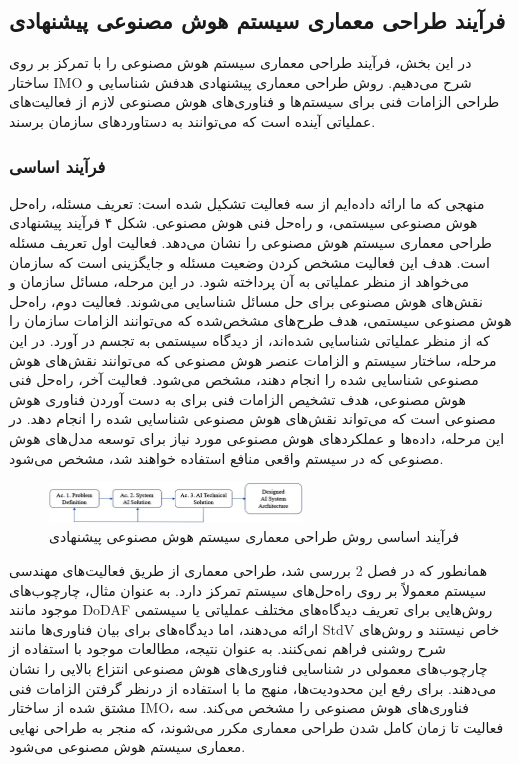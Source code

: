 \documentclass[a4paper,10pt]{article}
\begin{document}
        \subsection{فرآیند طراحی معماری سیستم هوش مصنوعی پیشنهادی}

            در این بخش، فرآیند طراحی معماری سیستم هوش مصنوعی را با تمرکز بر روی ساختار IMO شرح می‌دهیم. روش طراحی معماری پیشنهادی هدفش شناسایی و طراحی الزامات فنی برای سیستم‌ها و فناوری‌های هوش مصنوعی لازم از فعالیت‌های عملیاتی آینده است که می‌توانند به دستاوردهای سازمان برسند.

            \subsubsection{فرآیند اساسی}

                منهجی که ما ارائه داده‌ایم از سه فعالیت تشکیل شده است: تعریف مسئله، راه‌حل هوش مصنوعی سیستمی، و راه‌حل فنی هوش مصنوعی. شکل ۴ فرآیند پیشنهادی طراحی معماری سیستم هوش مصنوعی را نشان می‌دهد. فعالیت اول تعریف مسئله است. هدف این فعالیت مشخص کردن وضعیت مسئله و جایگزینی است که سازمان می‌خواهد از منظر عملیاتی به آن پرداخته شود. در این مرحله، مسائل سازمان و نقش‌های هوش مصنوعی برای حل مسائل شناسایی می‌شوند. فعالیت دوم، راه‌حل هوش مصنوعی سیستمی، هدف طرح‌های مشخص‌شده که می‌توانند الزامات سازمان را که از منظر عملیاتی شناسایی شده‌اند، از دیدگاه سیستمی به تجسم در آورد. در این مرحله، ساختار سیستم و الزامات عنصر هوش مصنوعی که می‌توانند نقش‌های هوش مصنوعی شناسایی شده را انجام دهند، مشخص می‌شود. فعالیت آخر، راه‌حل فنی هوش مصنوعی، هدف تشخیص الزامات فنی برای به دست آوردن فناوری هوش مصنوعی است که می‌تواند نقش‌های هوش مصنوعی شناسایی شده را انجام دهد. در این مرحله، داده‌ها و عملکردهای هوش مصنوعی مورد نیاز برای توسعه مدل‌های هوش مصنوعی که در سیستم واقعی منافع استفاده خواهند شد، مشخص می‌شود.

                \begin{figure}[htbp]

                    \centering
                    \includegraphics[width=0.6\textwidth]{image/fig 4.png}
                    \caption{فرآیند اساسی روش طراحی معماری سیستم هوش مصنوعی پیشنهادی}
                    \label{fig:fig_4}
                
                \end{figure}
            
                همانطور که در فصل 2 بررسی شد، طراحی معماری از طریق فعالیت‌های مهندسی سیستم معمولاً بر روی راه‌حل‌های سیستم تمرکز دارد. به عنوان مثال، چارچوب‌های موجود مانند DoDAF روش‌هایی برای تعریف دیدگاه‌های مختلف عملیاتی یا سیستمی ارائه می‌دهند، اما دیدگاه‌های برای بیان فناوری‌ها مانند StdV خاص نیستند و روش‌های شرح روشنی فراهم نمی‌کنند. به عنوان نتیجه، مطالعات موجود با استفاده از چارچوب‌های معمولی در شناسایی فناوری‌های هوش مصنوعی انتزاع بالایی را نشان می‌دهند. برای رفع این محدودیت‌ها، منهج ما با استفاده از درنظر گرفتن الزامات فنی مشتق شده از ساختار IMO، فناوری‌های هوش مصنوعی را مشخص می‌کند. سه فعالیت تا زمان کامل شدن طراحی معماری مکرر می‌شوند، که منجر به طراحی نهایی معماری سیستم هوش مصنوعی می‌شود.
\end{document}
